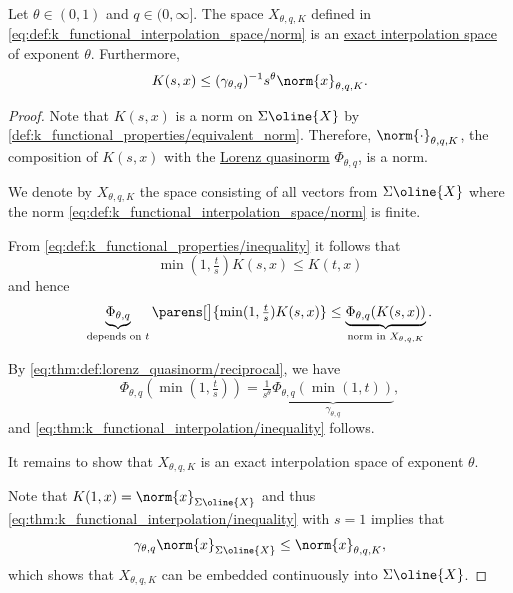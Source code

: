 \begin{theorem}\label{thm:k_functional_interpolation}
  Let \( \theta \in (0, 1) \) and \( q \in (0, \infty] \). The space \( X_{\theta,q,K} \) defined in \cref{eq:def:k_functional_interpolation_space/norm} is an \hyperref[def:banach_interpolation_space_exponent]{exact interpolation space} of exponent \( \theta \). Furthermore,
  \begin{equation}\label{eq:thm:k_functional_interpolation/inequality}
    K(s, x) \leq (\gamma_{\theta,q})^{-1} s^\theta \norm{x}_{\theta,q,K}.
  \end{equation}
\end{theorem}
\begin{proof}
  Note that \( K(s, x) \) is a norm on \( \Sigma \oline{X} \) by \cref{def:k_functional_properties/equivalent_norm}. Therefore, \( \norm{\cdot}_{\theta,q,K} \), the composition of \( K(s, x) \) with the \hyperref[def:lorenz_quasinorm]{Lorenz quasinorm} \( \Phi_{\theta,q} \), is a norm.

  We denote by \( X_{\theta,q,K} \) the space consisting of all vectors from \( \Sigma \oline{X} \) where the norm \eqref{eq:def:k_functional_interpolation_space/norm} is finite.

  From \eqref{eq:def:k_functional_properties/inequality} it follows that
  \begin{equation*}
    \min(1, \tfrac t s) K(s, x) \leq K(t, x)
  \end{equation*}
  and hence
  \begin{equation*}
    \underbrace{\Phi_{\theta,q}}_{\text{depends on } t} \parens[\big]{ \min(1, \tfrac t s) K(s, x) } \leq \underbrace{\Phi_{\theta,q}(K(s, x))}_{\text{norm in } X_{\theta,q,K}}.
  \end{equation*}

  By \eqref{eq:thm:def:lorenz_quasinorm/reciprocal}, we have
  \begin{equation*}
    \Phi_{\theta,q}(\min(1, \tfrac t s)) = \tfrac 1 {s^\theta} \underbrace{\Phi_{\theta,q}(\min(1, t))}_{\hyperref[eq:def:lorenz_quasinorm/gamma]{\gamma_{\theta,q}}},
  \end{equation*}
  and \eqref{eq:thm:k_functional_interpolation/inequality} follows.

  It remains to show that \( X_{\theta,q,K} \) is an exact interpolation space of exponent \( \theta \).

  Note that \( K(1, x) = \norm{x}_{\Sigma \oline{X}} \) and thus \eqref{eq:thm:k_functional_interpolation/inequality} with \( s = 1 \) implies that
  \begin{equation*}
    \gamma_{\theta,q} \norm{x}_{\Sigma \oline{X}} \leq \norm{x}_{\theta,q,K},
  \end{equation*}
  which shows that \( X_{\theta,q,K} \) can be embedded continuously into \( \Sigma \oline{X} \).


\end{proof}
